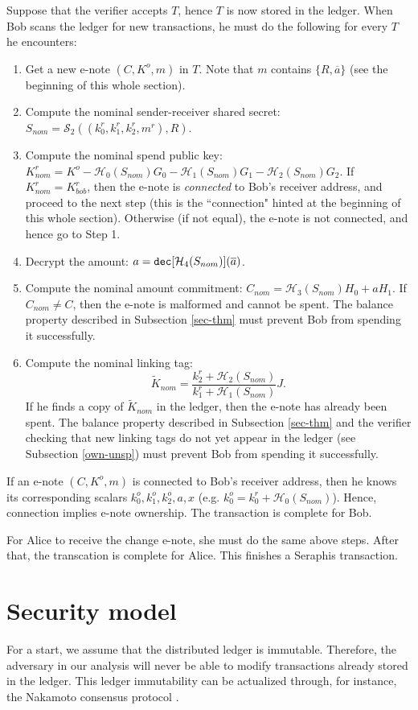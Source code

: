 \documentclass{article}
\theoremstyle{plain}
\theoremstyle{remark}
\begin{document}
Suppose that the verifier accepts $T$, hence $T$ is now stored in the ledger. When Bob scans the ledger for new transactions, he must do the following for every $T$ he encounters:
\begin{enumerate}
    \item Get a new e-note $(C, K^o, m)$ in $T$. Note that $m$ contains $\{R, \overline{a}\}$ (see the beginning of this whole section).
    \item Compute the nominal sender-receiver shared secret: $S_{nom} = \mathcal{S}_2((k_0^r, k_1^r, k_2^r, m^r), R) $.
    \item Compute the nominal spend public key: $K_{nom}^r = K^o - \mathcal{H}_0(S_{nom}) G_0 - \mathcal{H}_1(S_{nom}) G_1 - \mathcal{H}_2(S_{nom}) G_2$. If $K_{nom}^r = K_{bob}^r$, then the e-note is \textit{connected} to Bob's receiver address, and proceed to the next step (this is the ``connection" hinted at the beginning of this whole section).  Otherwise (if not equal), the e-note is not connected, and hence go to Step 1.
    \item Decrypt the amount: $a = {\tt dec}[\mathcal{H}_4(S_{nom})](\overline a)$.
    \item Compute the nominal amount commitment: $C_{nom} = \mathcal{H}_3(S_{nom}) H_0 + a H_1$. If $C_{nom} \ne C$, then the e-note is malformed and cannot be spent. The balance property described in Subsection \ref{sec-thm} must prevent Bob from spending it successfully.
    \item Compute the nominal linking tag: $$\tilde{K}_{nom} = \frac{k_2^r + \mathcal{H}_2(S_{nom})}{k_1^r + \mathcal{H}_1(S_{nom})}J.$$ If he finds a copy of $\tilde{K}_{nom}$ in the ledger, then the e-note has already been spent. The balance property described in Subsection \ref{sec-thm} and the verifier checking that new linking tags do not yet appear in the ledger (see Subsection \ref{own-unsp}) must prevent Bob from spending it successfully.
\end{enumerate}
If an e-note $(C, K^o, m)$ is connected to Bob's receiver address, then he knows its corresponding scalars $k_0^o, k_1^o, k_2^o, a, x$ (e.g. $k_0^o = k_0^r + \mathcal{H}_0(S_{nom})$). Hence, connection implies e-note ownership. The transaction is complete for Bob.

For Alice to receive the change e-note, she must do the same above steps. After that, the transcation is complete for Alice. This finishes a Seraphis transaction.

\section{Security model}\label{sec}
For a start, we assume that the distributed ledger is immutable. Therefore, the adversary in our analysis will never be able to modify transactions already stored in the ledger. This ledger immutability can be actualized through, for instance, the Nakamoto consensus protocol \cite{bitcoin}.
\end{document}
